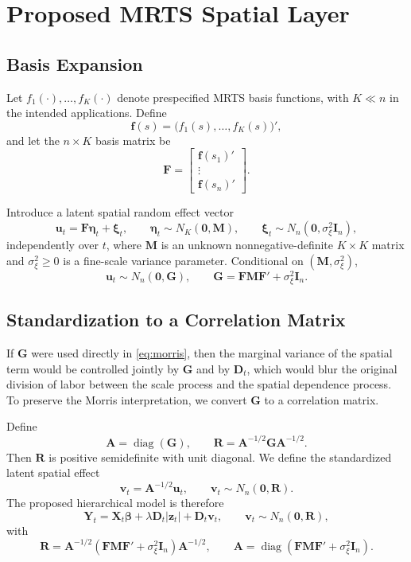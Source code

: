 \documentclass[11pt]{article}
\newcommand{\bY}{\mathbf{Y}}
\newcommand{\bX}{\mathbf{X}}
\newcommand{\bD}{\mathbf{D}}
\newcommand{\bF}{\mathbf{F}}
\newcommand{\bG}{\mathbf{G}}
\newcommand{\bM}{\mathbf{M}}
\newcommand{\bR}{\mathbf{R}}
\newcommand{\bA}{\mathbf{A}}
\newcommand{\bz}{\mathbf{z}}
\newcommand{\bzero}{\mathbf{0}}
\newcommand{\diag}{\operatorname{diag}}
\newcommand{\I}{\mathbf{I}}
\begin{document}
\section{Proposed MRTS Spatial Layer}

\subsection{Basis Expansion}

Let $f_1(\cdot), \ldots, f_K(\cdot)$ denote prespecified MRTS basis functions,
with $K \ll n$ in the intended applications. Define
\[
\mathbf{f}(s) = \bigl(f_1(s), \ldots, f_K(s)\bigr)',
\]
and let the $n \times K$ basis matrix be
\[
\bF = \begin{bmatrix}
\mathbf{f}(s_1)' \\
\vdots \\
\mathbf{f}(s_n)'
\end{bmatrix}.
\]

Introduce a latent spatial random effect vector
\[
\mathbf{u}_t = \bF \bm{\eta}_t + \bm{\xi}_t,
\qquad
\bm{\eta}_t \sim N_K(\bzero, \bM),
\qquad
\bm{\xi}_t \sim N_n(\bzero, \sigma_\xi^2 \I_n),
\]
independently over $t$, where $\bM$ is an unknown nonnegative-definite
$K \times K$ matrix and $\sigma_\xi^2 \ge 0$ is a fine-scale variance
parameter. Conditional on $(\bM, \sigma_\xi^2)$,
\[
\mathbf{u}_t \sim N_n(\bzero, \bG),
\qquad
\bG = \bF \bM \bF' + \sigma_\xi^2 \I_n.
\]

\subsection{Standardization to a Correlation Matrix}

If $\bG$ were used directly in \eqref{eq:morris}, then the marginal variance of
the spatial term would be controlled jointly by $\bG$ and by $\bD_t$, which
would blur the original division of labor between the scale process and the
spatial dependence process. To preserve the Morris interpretation, we convert
$\bG$ to a correlation matrix.

Define
\[
\bA = \diag(\bG),
\qquad
\bR = \bA^{-1/2} \bG \bA^{-1/2}.
\]
Then $\bR$ is positive semidefinite with unit diagonal. We define the
standardized latent spatial effect
\[
\mathbf{v}_t = \bA^{-1/2} \mathbf{u}_t,
\qquad
\mathbf{v}_t \sim N_n(\bzero, \bR).
\]
The proposed hierarchical model is therefore
\begin{equation}
\bY_t = \bX_t \bm{\beta} + \lambda \bD_t |\bz_t| + \bD_t \mathbf{v}_t,
\qquad
\mathbf{v}_t \sim N_n(\bzero, \bR),
\label{eq:proposed}
\end{equation}
with
\[
\bR = \bA^{-1/2} (\bF \bM \bF' + \sigma_\xi^2 \I_n) \bA^{-1/2},
\qquad
\bA = \diag(\bF \bM \bF' + \sigma_\xi^2 \I_n).
\]
\end{document}
